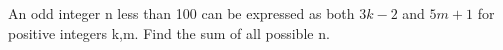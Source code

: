 An odd integer n less than 100 can be expressed as both $3 k-2$ and $5 m+1$ for positive integers k,m. Find the sum of all possible n.
